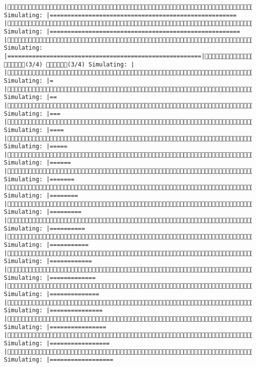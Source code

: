 \documentclass[]{article}
\begin{document}
\begin{verbatim}
|(2/4) Simulating: |=====================================================  |(2/4) Simulating: |====================================================== |(2/4) Simulating: |=======================================================|(2/4) (3/4) (3/4) Simulating: |                                                       |(3/4) Simulating: |=                                                      |(3/4) Simulating: |==                                                     |(3/4) Simulating: |===                                                    |(3/4) Simulating: |====                                                   |(3/4) Simulating: |=====                                                  |(3/4) Simulating: |======                                                 |(3/4) Simulating: |=======                                                |(3/4) Simulating: |========                                               |(3/4) Simulating: |=========                                              |(3/4) Simulating: |==========                                             |(3/4) Simulating: |===========                                            |(3/4) Simulating: |============                                           |(3/4) Simulating: |=============                                          |(3/4) Simulating: |==============                                         |(3/4) Simulating: |===============                                        |(3/4) Simulating: |================                                       |(3/4) Simulating: |=================                                      |(3/4) Simulating: |==================                                
\end{verbatim}
\end{document}
